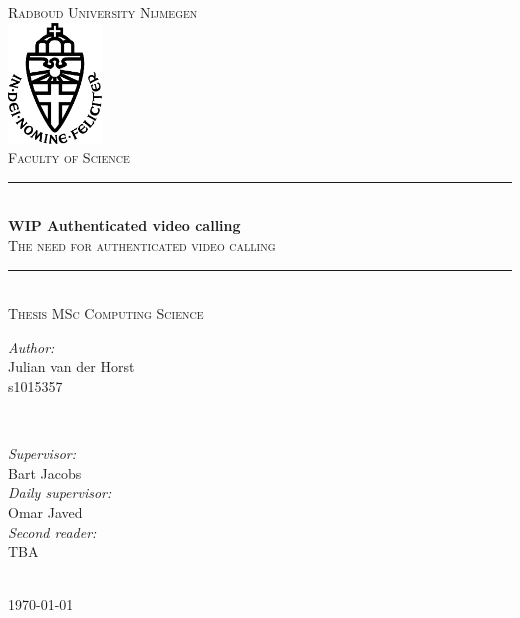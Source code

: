 \documentclass{report}
\title{\thesistitle}
\author{\thesisauthorfirst\space\thesisauthorsecond}
\date{\thesisdate}
\def\thesistitle{WIP Authenticated video calling}
\def\thesissubtitle{The need for authenticated video calling}
\def\thesisauthorfirst{Julian van der Horst \\ s1015357}
\def\thesisauthorsecond{}
\def\thesissupervisorfirst{Bart Jacobs}
\def\thesissupervisorsecond{Omar Javed}
\def\thesissecondreaderfirst{TBA}
\def\thesissecondreadersecond{}
\def\thesisdate{May 2023}
\begin{document}
\begin{titlepage}
	\thispagestyle{empty}
	\newcommand{\HRule}{\rule{\linewidth}{0.5mm}}
	\center
	\textsc{\Large Radboud University Nijmegen}\\[.7cm]
	\includegraphics[width=25mm]{img/in_dei_nomine_feliciter.eps}\\[.5cm]
	\textsc{Faculty of Science}\\[0.5cm]
	
	\HRule \\[0.4cm]
	{ \huge \bfseries \thesistitle}\\[0.1cm]
	\textsc{\thesissubtitle}\\
	\HRule \\[.5cm]
	\textsc{\large Thesis MSc Computing Science}\\[.5cm]
	
	\begin{minipage}{0.4\textwidth}
	\begin{flushleft} \large
	\emph{Author:}\\
	\thesisauthorfirst\space \textsc{\thesisauthorsecond}
	\end{flushleft}
	\end{minipage}
	~
	\begin{minipage}{0.4\textwidth}
	\begin{flushright} \large
	\emph{Supervisor:} \\
	\thesissupervisorfirst  \\[1em]
    \emph{Daily supervisor:} \\
    \thesissupervisorsecond \\[1em]
	\emph{Second reader:} \\
	\thesissecondreaderfirst\\ 
	\end{flushright}
	\end{minipage}\\[4cm]
	\vfill
	{\large \today}\\
	\clearpage
\end{titlepage}

\tableofcontents
\end{document}
